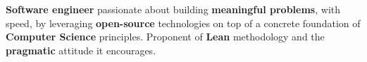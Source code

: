 
\begin{cvparagraph}
  \textbf{Software engineer} passionate about building \textbf{meaningful problems}, with speed, by leveraging \textbf{open-source} technologies on top of a concrete foundation of \textbf{Computer Science} principles. Proponent of \textbf{Lean} methodology and the \textbf{pragmatic} attitude it encourages.
\end{cvparagraph}
